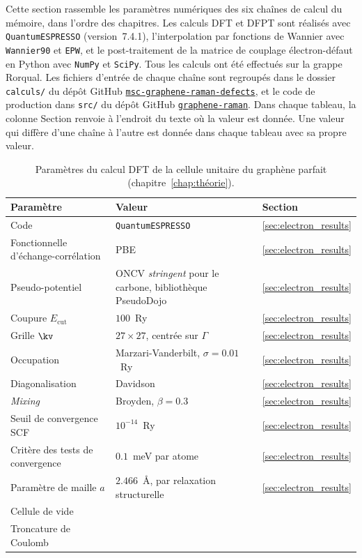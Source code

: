 Cette section rassemble les paramètres numériques des six chaînes de calcul du mémoire, dans l'ordre des chapitres. Les calculs DFT et DFPT sont réalisés avec \texttt{QuantumESPRESSO} (version~7.4.1), l'interpolation par fonctions de Wannier avec \texttt{Wannier90} et \texttt{EPW}, et le post-traitement de la matrice de couplage électron-défaut en Python avec \texttt{NumPy} et \texttt{SciPy}.
Tous les calculs ont été effectués sur la grappe Rorqual. Les fichiers d'entrée de chaque chaîne sont regroupés dans le dossier \texttt{calculs/} du dépôt GitHub \href{https://github.com/Gregb26/msc-graphene-raman-defects}{\texttt{msc-graphene-raman-defects}}, et le code de production dans \texttt{src/} du dépôt GitHub \href{https://github.com/Gregb26/graphene-raman}{\texttt{graphene-raman}}.
Dans chaque tableau, la colonne \og Section \fg{} renvoie à l'endroit du texte où la valeur est donnée. Une valeur qui diffère d'une chaîne à l'autre est donnée dans chaque tableau avec sa propre valeur.

\begin{table}[htbp]
    \centering
    \caption[Paramètres du calcul DFT de la cellule unitaire.]{Paramètres du calcul DFT de la cellule unitaire du graphène parfait (chapitre~\ref{chap:théorie}).}
    \label{tab:param_dft}
    \small
    \setlength{\tabcolsep}{4pt}
    \begin{tabular}{p{} p{} p{}}
        \hline\hline
        Paramètre & Valeur & Section \\
        \hline
        Code & \texttt{QuantumESPRESSO} & \ref{sec:electron_results} \\
        Fonctionnelle d'échange-corrélation & PBE & \ref{sec:electron_results} \\
        Pseudo-potentiel & ONCV \textit{stringent} pour le carbone, bibliothèque PseudoDojo & \ref{sec:electron_results} \\
        Coupure $E_\text{cut}$ & $100$~Ry & \ref{sec:electron_results} \\
        Grille $\kv$ & $27\times 27$, centrée sur $\Gamma$ & \ref{sec:electron_results} \\
        Occupation & Marzari-Vanderbilt, $\sigma = 0.01$~Ry & \ref{sec:electron_results} \\
        Diagonalisation & Davidson & \ref{sec:electron_results} \\
        \textit{Mixing} & Broyden, $\beta = 0.3$ & \ref{sec:electron_results} \\
        Seuil de convergence SCF & $10^{-14}$~Ry & \ref{sec:electron_results} \\
        Critère des tests de convergence & $0.1$~meV par atome & \ref{sec:electron_results} \\
        Paramètre de maille $a$ & $2.466$~\AA{}, par relaxation structurelle & \ref{sec:electron_results} \\
        Cellule de vide & & \\
        Troncature de Coulomb & & \\
        \hline\hline
    \end{tabular}
\end{table}


